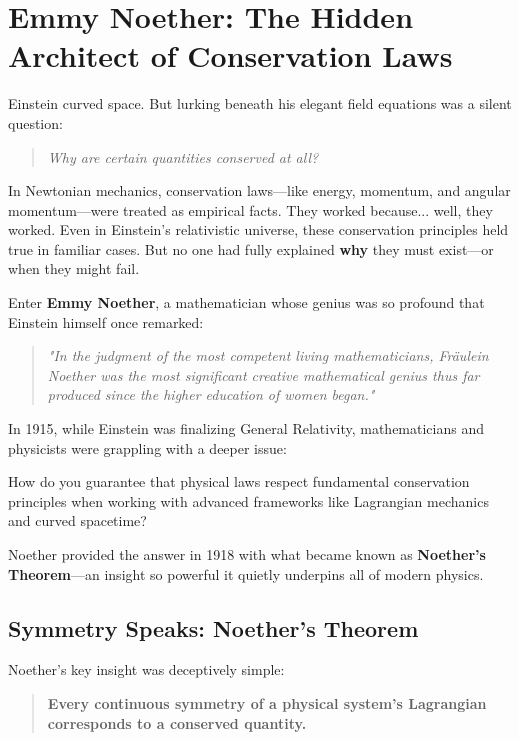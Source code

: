 \section{Emmy Noether: The Hidden Architect of Conservation Laws}

Einstein curved space.  
But lurking beneath his elegant field equations was a silent question:

\begin{quote}
\textit{Why are certain quantities conserved at all?}
\end{quote}

In Newtonian mechanics, conservation laws—like energy, momentum, and angular momentum—were treated as empirical facts. They worked because... well, they worked. Even in Einstein’s relativistic universe, these conservation principles held true in familiar cases. But no one had fully explained \textbf{why} they must exist—or when they might fail.

Enter \textbf{Emmy Noether}, a mathematician whose genius was so profound that Einstein himself once remarked:

\begin{quote}
\textit{"In the judgment of the most competent living mathematicians, Fräulein Noether was the most significant creative mathematical genius thus far produced since the higher education of women began."}
\end{quote}

In 1915, while Einstein was finalizing General Relativity, mathematicians and physicists were grappling with a deeper issue: 

How do you guarantee that physical laws respect fundamental conservation principles when working with advanced frameworks like Lagrangian mechanics and curved spacetime?

Noether provided the answer in 1918 with what became known as \textbf{Noether’s Theorem}—an insight so powerful it quietly underpins all of modern physics.

\subsection{Symmetry Speaks: Noether’s Theorem}

Noether’s key insight was deceptively simple:

\begin{quote}
\textbf{Every continuous symmetry of a physical system’s Lagrangian corresponds to a conserved quantity.}
\end{quote}

